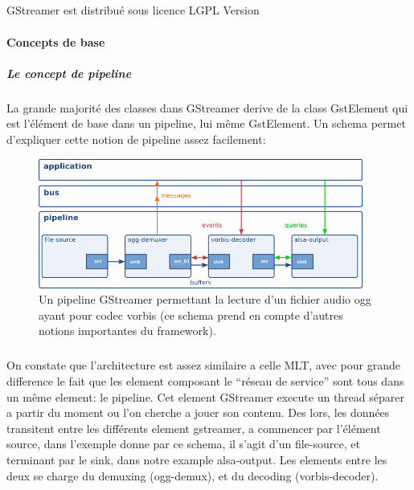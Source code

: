 \subparagraph{}

GStreamer est distribué sous licence LGPL Version

\paragraph{Concepts de base}

\subparagraph{Le concept de pipeline}

\subparagraph{}

La grande majorité des classes dans GStreamer derive de la class
GstElement qui est l'élément de base dans un pipeline, lui même
GstElement. Un schema permet d'expliquer cette notion de pipeline assez
facilement:

\begin{figure} [H]

  \begin{center}

    \includegraphics[width=0.95\textwidth]{images/gstpipeline}

  \end{center}

  \caption{Un pipeline GStreamer permettant la lecture d'un fichier
  audio ogg
    ayant pour codec vorbis (ce schema prend en compte d'autres notions
    importantes du framework).}

  \label{Yes}

\end{figure}

\subparagraph{}

On constate que l'architecture est assez similaire a celle MLT, avec
pour grande difference le fait que les element composant le ``réseau
de service'' sont tous dans un même element: le pipeline. Cet element
GStreamer execute un thread séparer a partir du moment ou l'on cherche a
jouer son contenu. Des lors, les données transitent entre les différents
element gstreamer, a commencer par l'élément source, dans l'exemple
donne par ce schema, il s'agit d'un file-source, et terminant par le
sink, dans notre example alsa-output. Les elements entre les deux se
charge du demuxing (ogg-demux), et du decoding (vorbis-decoder).

